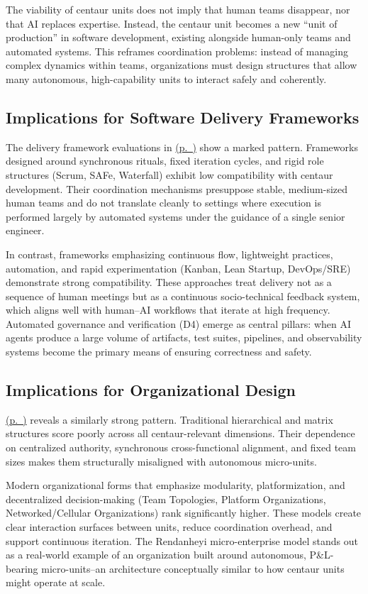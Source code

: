 \documentclass[11pt, a4paper, twocolumn]{article} %
\newcommand{\namerefp}[1]{\hyperref[#1]{\nameref{#1} (p.~\pageref{#1})}}
\begin{document}
The viability of centaur units does not imply that human teams disappear, nor
that AI replaces expertise. Instead, the centaur unit becomes a new ``unit of
production'' in software development, existing alongside human-only teams and
automated systems. This reframes coordination problems: instead of managing
complex dynamics within teams, organizations must design structures that allow
many autonomous, high-capability units to interact safely and coherently.

\subsection*{Implications for Software Delivery Frameworks}

The delivery framework evaluations in \namerefp{sec:delivery-eval} show a marked pattern. Frameworks designed
around synchronous rituals, fixed iteration cycles, and rigid role structures
(Scrum, SAFe, Waterfall) exhibit low compatibility with centaur development.
Their coordination mechanisms presuppose stable, medium-sized human teams and do
not translate cleanly to settings where execution is performed largely by
automated systems under the guidance of a single senior engineer.

In contrast, frameworks emphasizing continuous flow, lightweight practices,
automation, and rapid experimentation (Kanban, Lean Startup, DevOps/SRE)
demonstrate strong compatibility. These approaches treat delivery not as a
sequence of human meetings but as a continuous socio-technical feedback system,
which aligns well with human--AI workflows that iterate at high frequency.
Automated governance and verification (D4) emerge as central pillars: when AI
agents produce a large volume of artifacts, test suites, pipelines, and
observability systems become the primary means of ensuring correctness and
safety.

\subsection*{Implications for Organizational Design}

\namerefp{sec:org-eval} reveals a similarly strong pattern. Traditional
hierarchical and matrix structures score poorly across all centaur-relevant
dimensions. Their dependence on centralized authority, synchronous
cross-functional alignment, and fixed team sizes makes them structurally
misaligned with autonomous micro-units.

Modern organizational forms that emphasize modularity, platformization, and
decentralized decision-making (Team Topologies, Platform Organizations,
Networked/Cellular Organizations) rank significantly higher. These models create
clear interaction surfaces between units, reduce coordination overhead, and
support continuous iteration. The Rendanheyi micro-enterprise model stands out as
a real-world example of an organization built around autonomous, P\&L-bearing
micro-units--an architecture conceptually similar to how centaur units might
operate at scale.
\end{document}
